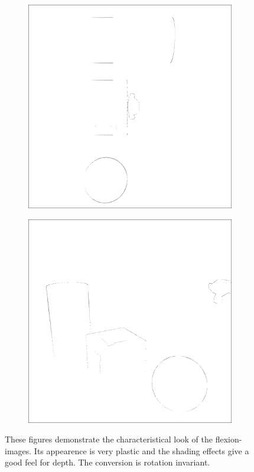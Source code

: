 \begin{figure}[H]
\begin{subfigure}[t]{0.32\textwidth}
        \includegraphics[width=\linewidth]{chapter04/img/flexion-0030.png}
    \end{subfigure}
    \begin{subfigure}[t]{0.32\textwidth}
        \includegraphics[width=\linewidth]{chapter04/img/flexion-0210.png}
    \end{subfigure}
    \caption{These figures demonstrate the characteristical look of the \Glspl{flexion-image}. Its appearence is very plastic and the shading effects give a good feel for depth. The conversion is rotation invariant.}\label{fig:flexion_images}
\end{figure}

